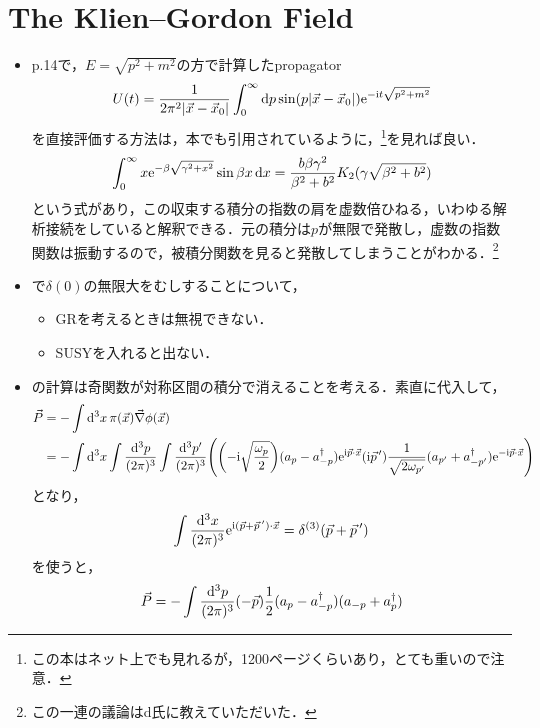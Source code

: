 \section{The Klien--Gordon Field}
\begin{itemize}
	\item p.14で，$E = \sqrt{p^2+m^2}$の方で計算したpropagator
		\begin{equation}
			U(t) = \frac{1}{2\pi^2\abs{\vec{x}-\vec{x}_0}}\int_0^\infty\dd{p}\sin(p\abs{\vec{x}-\vec{x}_0})\mathrm{e}^{-\mathrm{i} t\sqrt{p^2+m^2}}
		\end{equation}
		を直接評価する方法は，本でも引用されているように，\cite[p.491]{GRA80}\footnote{この本はネット上でも見れるが，1200ページくらいあり，とても重いので注意．}を見れば良い．
		\begin{equation}
			\int_0^{\infty}x\mathrm{e}^{-\beta\sqrt{\gamma^2+x^2}}\sin\beta x \dd{x} = \frac{b\beta\gamma^2}{\beta^2+b^2}K_2(\gamma\sqrt{\beta^2+b^2})
		\end{equation}
		という式があり，この収束する積分の指数の肩を虚数倍ひねる，いわゆる解析接続をしていると解釈できる．元の積分は$p$が無限で発散し，虚数の指数関数は振動するので，被積分関数を見ると発散してしまうことがわかる．\footnote{この一連の議論はd氏に教えていただいた．}
	\item {}で$\delta(0)$の無限大をむしすることについて，
		\begin{itemize}
			\item GRを考えるときは無視できない．
			\item SUSYを入れると出ない．
		\end{itemize}
	\item {}の計算は奇関数が対称区間の積分で消えることを考える．素直に代入して，
		\begin{align}
			\vec{P} &= -\int\dd[3]{x}\pi(\vec{x})\vec{\nabla}\phi(\vec{x})\\
					&= -\int\dd[3]{x}\int \frac{\dd[3]{p}}{(2\pi)^{3}}\int \frac{\dd[3]{p'}}{(2\pi)^{3}}\qty(\qty(-\mathrm{i}\sqrt{\frac{\omega_{p}}{2}})(a_p-a_{-p}^{\dag})\mathrm{e}^{\mathrm{i}\vec{p}\cdot\vec{x}}(\mathrm{i}\vec{p}^{\, \prime})\frac{1}{\sqrt{2\omega_{p'}}}(a_{p'}+a_{-p'}^\dag)\mathrm{e}^{-\mathrm{i}\vec{p}\cdot\vec{x}})
		\end{align}
		となり，
		\begin{equation}
			\int \frac{\dd[3]{x}}{(2\pi)^{3}}\mathrm{e}^{\mathrm{i}(\vec{p}+\vec{p}{\, '})\cdot\vec{x}} = \delta^{(3)}(\vec{p}+\vec{p}\,')
		\end{equation}
		を使うと，
		\begin{equation}
			\vec{P} = -\int \frac{\dd[3]{p}}{(2\pi)^{3}}(-\vec{p})\frac{1}{2}(a_p-a_{-p}^{\dag})(a_{-p}+a_{p}^\dag)
		\end{equation}

\end{itemize}
